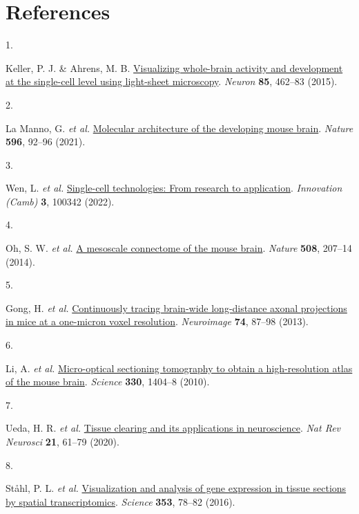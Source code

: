 \documentclass[
  12pt,
]{article}
\newlength{\cslhangindent}
\newlength{\csllabelwidth}
\newenvironment{CSLReferences}[2] %
 {\begin{list}{}{%
  \setlength{\itemindent}{0pt}
  \setlength{\leftmargin}{0pt}
  \setlength{\parsep}{0pt}
  \ifodd #1
   \setlength{\leftmargin}{\cslhangindent}
   \setlength{\itemindent}{-1\cslhangindent}
  \fi
  \setlength{\itemsep}{#2\baselineskip}}}
 {\end{list}}
\newcommand{\CSLLeftMargin}[1]{\parbox[t]{\csllabelwidth}{\strut#1\strut}}
\newcommand{\CSLRightInline}[1]{\parbox[t]{\linewidth - \csllabelwidth}{\strut#1\strut}}
\begin{document}
\section*{References}\label{references}

\label{refs}
\begin{CSLReferences}{0}{0}
\CSLLeftMargin{1. }%
\CSLRightInline{Keller, P. J. \& Ahrens, M. B.
\href{https://doi.org/10.1016/j.neuron.2014.12.039}{Visualizing
whole-brain activity and development at the single-cell level using
light-sheet microscopy}. \emph{Neuron} \textbf{85}, 462--83 (2015).}

\CSLLeftMargin{2. }%
\CSLRightInline{La Manno, G. \emph{et al.}
\href{https://doi.org/10.1038/s41586-021-03775-x}{Molecular architecture
of the developing mouse brain}. \emph{Nature} \textbf{596}, 92--96
(2021).}

\CSLLeftMargin{3. }%
\CSLRightInline{Wen, L. \emph{et al.}
\href{https://doi.org/10.1016/j.xinn.2022.100342}{Single-cell
technologies: From research to application}. \emph{Innovation (Camb)}
\textbf{3}, 100342 (2022).}

\CSLLeftMargin{4. }%
\CSLRightInline{Oh, S. W. \emph{et al.}
\href{https://doi.org/10.1038/nature13186}{A mesoscale connectome of the
mouse brain}. \emph{Nature} \textbf{508}, 207--14 (2014).}

\CSLLeftMargin{5. }%
\CSLRightInline{Gong, H. \emph{et al.}
\href{https://doi.org/10.1016/j.neuroimage.2013.02.005}{Continuously
tracing brain-wide long-distance axonal projections in mice at a
one-micron voxel resolution}. \emph{Neuroimage} \textbf{74}, 87--98
(2013).}

\CSLLeftMargin{6. }%
\CSLRightInline{Li, A. \emph{et al.}
\href{https://doi.org/10.1126/science.1191776}{Micro-optical sectioning
tomography to obtain a high-resolution atlas of the mouse brain}.
\emph{Science} \textbf{330}, 1404--8 (2010).}

\CSLLeftMargin{7. }%
\CSLRightInline{Ueda, H. R. \emph{et al.}
\href{https://doi.org/10.1038/s41583-019-0250-1}{Tissue clearing and its
applications in neuroscience}. \emph{Nat Rev Neurosci} \textbf{21},
61--79 (2020).}

\CSLLeftMargin{8. }%
\CSLRightInline{Ståhl, P. L. \emph{et al.}
\href{https://doi.org/10.1126/science.aaf2403}{Visualization and
analysis of gene expression in tissue sections by spatial
transcriptomics}. \emph{Science} \textbf{353}, 78--82 (2016).}


\end{CSLReferences}
\end{document}
